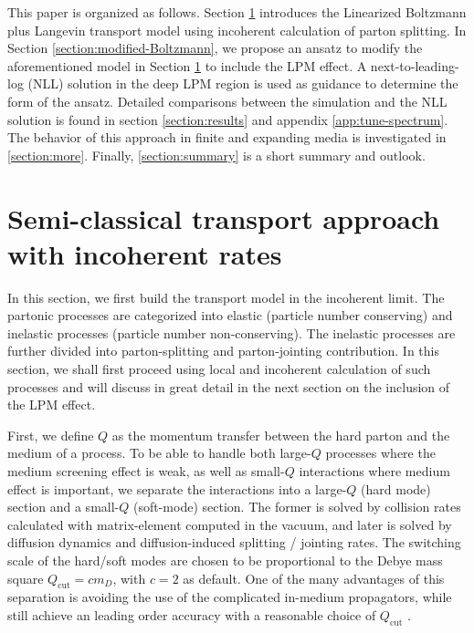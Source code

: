 \documentclass[aps, prc, reprint, amsmath, groupedaddress, nofootinbib]{revtex4-1}
\begin{document}
This paper is organized as follows. Section \ref{section:Boltzmann} introduces the Linearized Boltzmann plus Langevin transport model using incoherent calculation of parton splitting.
In Section \ref{section:modified-Boltzmann}, we propose an ansatz to modify the aforementioned model in Section \ref{section:Boltzmann} to include the LPM effect.
A next-to-leading-log (NLL) solution in the deep LPM region is used as guidance to determine the form of the ansatz.
Detailed comparisons between the simulation and the NLL solution is found in section \ref{section:results} and appendix \ref{app:tune-spectrum}.
The behavior of this approach in finite and expanding media is investigated in \ref{section:more}.
Finally, \ref{section:summary} is a short summary and outlook.



\section{Semi-classical transport approach with incoherent rates}\label{section:Boltzmann}
In this section, we first build the transport model in the incoherent limit. 
The partonic processes are categorized into elastic (particle number conserving) and inelastic processes (particle number non-conserving). 
The inelastic processes are further divided into parton-splitting and parton-jointing contribution. 
In this section, we shall first proceed using local and incoherent calculation of such processes and will discuss in great detail in the next section on  the inclusion of the LPM effect.

First, we define $Q$ as the momentum transfer between the hard parton and the medium of a process.
To be able to handle both large-$Q$ processes where the medium screening effect is weak, as well as small-$Q$ interactions where medium effect is important,
we separate the interactions into a large-$Q$ (hard mode) section and a small-$Q$ (soft-mode) section.
The former is solved by collision rates calculated with matrix-element computed in the vacuum, and later is solved by diffusion dynamics and diffusion-induced splitting / jointing rates.
The switching scale of the hard/soft modes are chosen to be proportional to the Debye mass square $Q_{\textrm{cut}} = c m_D$, with $c=2$ as default.
One of the many advantages of this separation is avoiding the use of the complicated in-medium propagators, while still achieve an leading order accuracy with a reasonable choice of $Q_{\textrm{cut}}$ \cite{Ghiglieri:2015ala}.
\end{document}
